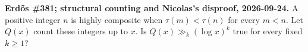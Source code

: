 \textbf{Erd\H{o}s \#381; structural counting and Nicolas's disproof, 2026-09-24.}
A positive integer $n$ is highly composite when $\tau(m)<\tau(n)$ for every $m<n$. Let $Q(x)$ count these integers up to $x$. Is $Q(x)\gg_k(\log x)^k$ true for every fixed $k\geq1$?
